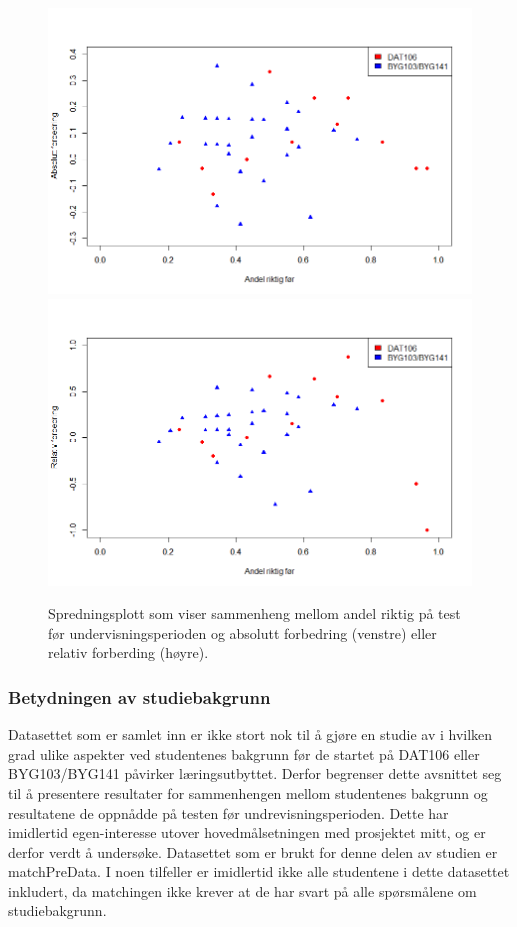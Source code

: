 \documentclass[a4paper,norsk,12pt]{article}
\begin{document}
\begin{figure}[p]
	\includegraphics[width=.48\textwidth]{./absoluttForbedringScatter}
	\includegraphics[width=.48\textwidth]{./relativForbedringScatter}
	\caption{Spredningsplott som viser sammenheng mellom andel riktig på test før undervisningsperioden og absolutt forbedring (venstre) eller relativ forberding (høyre).}
	\label{fig:scatter}
\end{figure}

\subsubsection{Betydningen av studiebakgrunn}
Datasettet som er samlet inn er ikke stort nok til å gjøre en studie av i hvilken grad ulike aspekter ved studentenes bakgrunn før de startet på DAT106 eller BYG103/BYG141 påvirker læringsutbyttet. Derfor begrenser dette avsnittet seg til å presentere resultater for sammenhengen mellom studentenes bakgrunn og resultatene de oppnådde på testen før undrevisningsperioden. Dette har imidlertid egen-interesse utover hovedmålsetningen med prosjektet mitt, og er derfor verdt å undersøke. Datasettet som er brukt for denne delen av studien er matchPreData. I noen tilfeller er imidlertid ikke alle studentene i dette datasettet inkludert, da matchingen ikke krever at de har svart på alle spørsmålene om studiebakgrunn.
\end{document}
